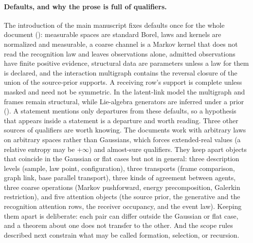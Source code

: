 \paragraph{Defaults, and why the prose is full of qualifiers.}
The introduction of the main manuscript fixes defaults once for the whole document
(): measurable spaces are standard Borel, laws and kernels are normalized
and measurable, a coarse channel is a Markov kernel that does not read the recognition law and
leaves observations alone, admitted observations have finite positive evidence, structural data are
parameters unless a law for them is declared, and the interaction multigraph contains the reversal
closure of the union of the source-prior supports. A receiving row's support is complete unless
masked and need not be symmetric. In the latent-link model the multigraph and frames remain
structural, while Lie-algebra generators are inferred under a prior
(). A statement mentions only departures from these defaults, so a
hypothesis that appears inside a statement is a departure and worth reading. Three other sources of
qualifiers are worth knowing. The documents work with arbitrary laws on arbitrary spaces rather than
Gaussians, which forces extended-real values (a relative entropy may be $+\infty$) and almost-sure
qualifiers. They keep apart objects that coincide in the Gaussian or flat cases but not in general:
three description levels (sample, law point, configuration), three transports (frame comparison,
graph link, base parallel transport), three kinds of agreement between agents, three coarse
operations (Markov pushforward, energy precomposition, Galerkin restriction), and five attention objects
(the source prior, the generative and the recognition attention rows, the receiver occupancy, and the
event law).
Keeping them apart is deliberate: each pair can differ outside the Gaussian or flat case, and a
theorem about one does not transfer to the other. And the scope rules described next constrain what
may be called formation, selection, or recursion.

